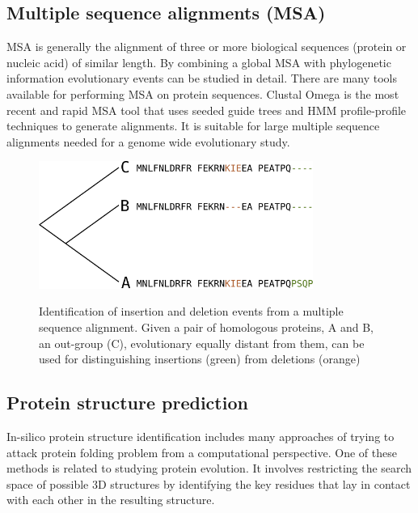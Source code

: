 \documentclass[11pt, a4paper,oneside]{report}
\begin{document}
\subsection{Multiple sequence alignments (MSA)}
 MSA is generally the alignment of three or more biological sequences (protein or nucleic acid) of similar length. By combining a global MSA with phylogenetic information evolutionary events can be studied in detail. There are many tools available for performing MSA on protein sequences. Clustal Omega is the most recent and rapid MSA tool\cite{Sievers2011} that uses seeded guide trees and HMM profile-profile techniques to generate alignments. It is suitable for large multiple sequence alignments needed for a genome wide evolutionary study. 

\begin{figure}[ht]
\begin{center}
\label{img:populations}
\includegraphics[width=0.8\textwidth]{figures/indel.png}
\end{center}
\caption{Identification of insertion and deletion events from a multiple sequence alignment. Given a pair of homologous proteins, A and B, an out-group (C), evolutionary equally distant from them, can be used for distinguishing insertions (green) from deletions (orange)} 
\end{figure}

\subsection{Protein structure prediction}
In-silico protein structure identification includes many approaches of trying to attack protein folding problem from a computational perspective. One of these methods is  related to studying protein evolution. It involves restricting the search space of possible 3D structures by identifying the key residues that lay in contact with each other in the resulting structure. 
\end{document}
